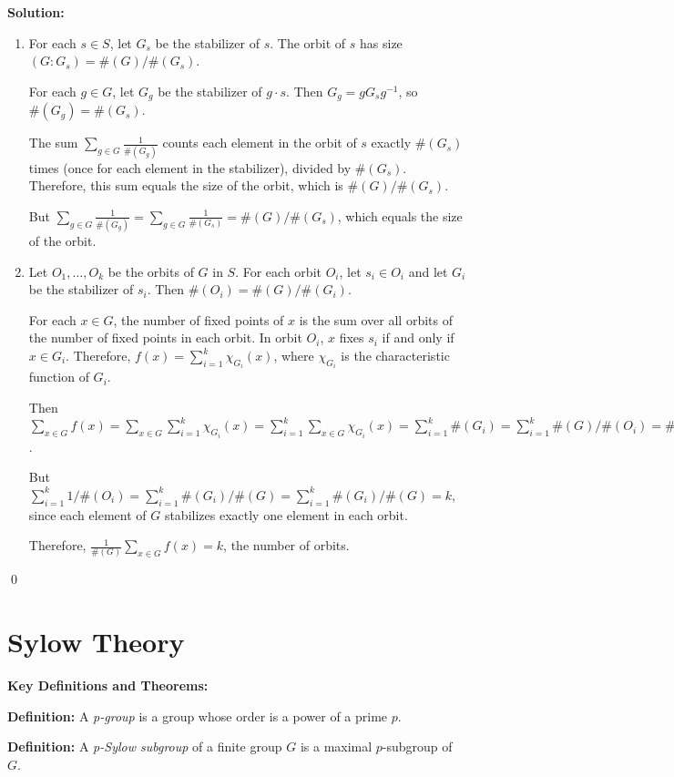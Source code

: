 \noindent\textbf{Solution:}
\begin{enumerate}[label=(\alph*)]
\item For each $s \in S$, let $G_s$ be the stabilizer of $s$. The orbit of $s$ has size $(G : G_s) = \#(G)/\#(G_s)$. 

For each $g \in G$, let $G_g$ be the stabilizer of $g \cdot s$. Then $G_g = gG_sg^{-1}$, so $\#(G_g) = \#(G_s)$. 

The sum $\sum_{g \in G} \frac{1}{\#(G_g)}$ counts each element in the orbit of $s$ exactly $\#(G_s)$ times (once for each element in the stabilizer), divided by $\#(G_s)$. Therefore, this sum equals the size of the orbit, which is $\#(G)/\#(G_s)$.

But $\sum_{g \in G} \frac{1}{\#(G_g)} = \sum_{g \in G} \frac{1}{\#(G_s)} = \#(G)/\#(G_s)$, which equals the size of the orbit.

\item Let $O_1, \ldots, O_k$ be the orbits of $G$ in $S$. For each orbit $O_i$, let $s_i \in O_i$ and let $G_i$ be the stabilizer of $s_i$. Then $\#(O_i) = \#(G)/\#(G_i)$.

For each $x \in G$, the number of fixed points of $x$ is the sum over all orbits of the number of fixed points in each orbit. In orbit $O_i$, $x$ fixes $s_i$ if and only if $x \in G_i$. Therefore, $f(x) = \sum_{i=1}^k \chi_{G_i}(x)$, where $\chi_{G_i}$ is the characteristic function of $G_i$.

Then $\sum_{x \in G} f(x) = \sum_{x \in G} \sum_{i=1}^k \chi_{G_i}(x) = \sum_{i=1}^k \sum_{x \in G} \chi_{G_i}(x) = \sum_{i=1}^k \#(G_i) = \sum_{i=1}^k \#(G)/\#(O_i) = \#(G) \sum_{i=1}^k 1/\#(O_i)$.

But $\sum_{i=1}^k 1/\#(O_i) = \sum_{i=1}^k \#(G_i)/\#(G) = \sum_{i=1}^k \#(G_i)/\#(G) = k$, since each element of $G$ stabilizes exactly one element in each orbit.

Therefore, $\frac{1}{\#(G)} \sum_{x \in G} f(x) = k$, the number of orbits.
\end{enumerate}


\qed
\section{Sylow Theory}

\textbf{Key Definitions and Theorems:}

\textbf{Definition:} A \textit{p-group} is a group whose order is a power of a prime $p$.

\textbf{Definition:} A \textit{p-Sylow subgroup} of a finite group $G$ is a maximal $p$-subgroup of $G$.

